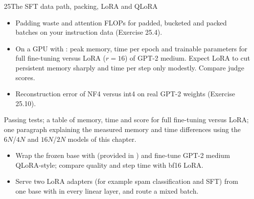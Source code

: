 \begin{labbox}{25}{The SFT data path, packing, LoRA and QLoRA}
\begin{itemize}
\item Padding waste and attention FLOPs for padded, bucketed and packed batches on your
instruction data (Exercise 25.4).
\item On a GPU with : peak memory, time per epoch and trainable parameters
for full fine-tuning versus LoRA ($r=16$) of GPT-2 medium. Expect LoRA to cut
persistent memory sharply and time per step only modestly. Compare judge scores.
\item Reconstruction error of NF4 versus int4 on real GPT-2 weights (Exercise 25.10).
\end{itemize}

Passing tests; a table of memory, time and score for full fine-tuning versus LoRA; one
paragraph explaining the measured memory and time differences using the $6N$/$4N$ and
$16N$/$2N$ models of this chapter.

\begin{itemize}
\item Wrap the frozen base with  (provided in )
and fine-tune GPT-2 medium QLoRA-style; compare quality and step time with bf16 LoRA.
\item Serve two LoRA adapters (for example spam classification and SFT) from one base
with  in every linear layer, and route a mixed batch.
\end{itemize}
\end{labbox}
